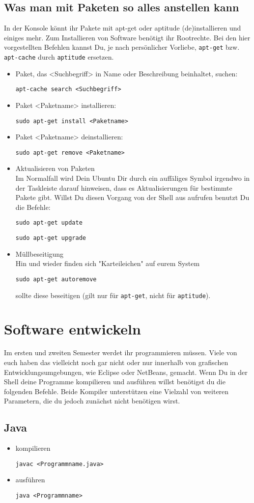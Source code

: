 \documentclass[a4paper,10pt]{article}
\newcommand{\befehl}[1]{
  \begin{center}
    \texttt{#1}
  \end{center}
}
\begin{document}
    \subsection{Was man mit Paketen so alles anstellen kann}
      In der Konsole könnt ihr Pakete mit apt-get oder aptitude (de)installieren und einiges mehr. Zum Installieren von Software benötigt ihr Rootrechte. Bei den hier vorgestellten Befehlen kannst Du, je nach persönlicher Vorliebe,  \texttt{apt-get} bzw. \texttt{apt-cache} durch \texttt{aptitude} ersetzen.
      \begin{itemize}
	\item Paket, das <Suchbegriff> in Name oder Beschreibung beinhaltet, suchen: 
	  \befehl{apt-cache search <Suchbegriff>}
	\item Paket <Paketname> installieren:
	  \befehl{sudo apt-get install <Paketname>}
	\item Paket <Paketname> deinstallieren:
	  \befehl{sudo apt-get remove <Paketname>}
	\item Aktualisieren von Paketen \\
	  Im Normalfall wird Dein Ubuntu Dir durch ein auffäliges Symbol irgendwo in der Taskleiste darauf hinweisen, dass es Aktualisierungen für bestimmte Pakete gibt. Willst Du diesen Vorgang von der Shell aus aufrufen benutzt Du die Befehle:
	  \befehl{sudo apt-get update}
	  \befehl{sudo apt-get upgrade}
	\item Müllbeseitigung \\
	  Hin und wieder finden sich "Karteileichen" auf eurem System
	  \befehl{sudo apt-get autoremove}
	  sollte diese beseitigen (gilt nur für \texttt{apt-get}, nicht für \texttt{aptitude}).
      \end{itemize}

  \section{Software entwickeln}
    Im ersten und zweiten Semester werdet ihr programmieren müssen. Viele von euch haben das vielleicht noch gar nicht oder nur innerhalb von grafischen Entwicklungsumgebungen, wie Eclipse oder NetBeans, gemacht. Wenn Du in der Shell deine Programme kompilieren und ausführen willst benötigst du die folgenden Befehle. Beide Kompiler unterstützen eine Vielzahl von weiteren Parametern, die du jedoch zunächst nicht benötigen wirst.
    \subsection{Java}
      \begin{itemize}
	\item kompilieren 
	  \befehl{javac <Programmname.java>}
	\item ausführen
	  \befehl{java <Programmname>}
      \end{itemize}
\end{document}
